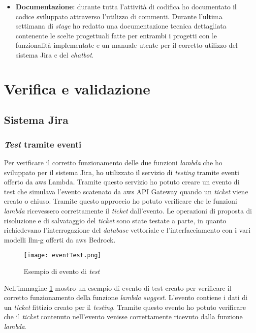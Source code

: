 \begin{itemize}
    \item \textbf{Documentazione}: durante tutta l'attività di codifica ho documentato il codice sviluppato attraverso l'utilizzo di commenti. Durante l'ultima settimana di \textit{stage} ho redatto una documentazione tecnica dettagliata contenente le scelte progettuali fatte per entrambi i progetti con le funzionalità implementate e un manuale utente per il corretto utilizzo del sistema Jira e del \textit{chatbot}. 
\end{itemize}

\section{Verifica e validazione}
\subsection{Sistema Jira}
\subsubsection{\textit{Test} tramite eventi}
Per verificare il corretto funzionamento delle due funzioni \textit{lambda} che ho sviluppato per il sistema Jira, ho utilizzato il servizio di \textit{testing} tramite eventi offerto da \gls{aws} Lambda. Tramite questo servizio ho potuto creare un evento di test che simulava l'evento scatenato da \gls{aws} API Gateway quando un \textit{ticket} viene creato o chiuso. Tramite questo approccio ho potuto verificare che le funzioni \textit{lambda} ricevessero correttamente il \textit{ticket} dall'evento. Le operazioni di proposta di risoluzione e di salvataggio del \textit{ticket} sono state testate a parte, in quanto richiedevano l'interrogazione del \textit{database} vettoriale e l'interfacciamento con i vari modelli \gls{llm-g} offerti da \gls{aws} Bedrock. 
\begin{figure}[H]
    \centering
    \texttt{[image: eventTest.png]}
    \caption{Esempio di evento di \textit{test}}
    \label{fig:testLambda}
\end{figure}
\noindent
Nell'immagine \ref{fig:testLambda} mostro un esempio di evento di test creato per verificare il corretto funzionamento della funzione \textit{lambda} \textit{suggest}. L'evento contiene i dati di un \textit{ticket} fittizio creato per il \textit{testing}. Tramite questo evento ho potuto verificare che il \textit{ticket} contenuto nell'evento venisse correttamente ricevuto dalla funzione \textit{lambda}.


